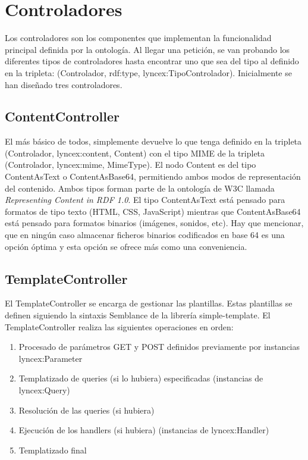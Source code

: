 \documentclass[12pt]{report} %
\begin{document}
\section{Controladores}
Los controladores son los componentes que implementan la funcionalidad principal definida por la ontología.
Al llegar una petición, se van probando los diferentes tipos de controladores hasta encontrar uno que sea del tipo al definido en la tripleta: (Controlador, rdf:type, lyncex:TipoControlador).
Inicialmente se han diseñado tres controladores.

\subsection{ContentController}
El más básico de todos, simplemente devuelve lo que tenga definido en la tripleta (Controlador, lyncex:content, Content) con el tipo MIME 
de la tripleta (Controlador, lyncex:mime, MimeType). El nodo Content es del tipo ContentAsText o ContentAsBase64, permitiendo ambos modos de representación del contenido.
Ambos tipos forman parte de la ontología de W3C llamada \textit{Representing Content in RDF 1.0}\cite{cnt}.
El tipo ContentAsText está pensado para formatos de tipo texto (HTML, CSS, JavaScript) mientras que ContentAsBase64 está pensado para formatos binarios (imágenes, sonidos, etc).
Hay que mencionar, que en ningún caso almacenar ficheros binarios codificados en base 64 es una opción óptima y esta opción se ofrece más como una conveniencia.

\subsection{TemplateController}
El TemplateController se encarga de gestionar las plantillas. Estas plantillas se definen siguiendo la sintaxis Semblance de la librería simple-template.
El TemplateController realiza las siguientes operaciones en orden:
\begin{enumerate}
    \item Procesado de parámetros GET y POST definidos previamente por instancias lyncex:Parameter
    \item Templatizado de queries (si lo hubiera) especificadas (instancias de lyncex:Query)
    \item Resolución de las queries (si hubiera)
    \item Ejecución de los handlers (si hubiera) (instancias de lyncex:Handler)
    \item Templatizado final
\end{enumerate}
\end{document}
